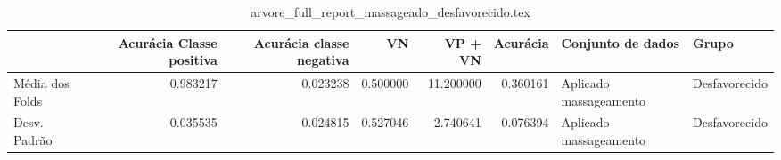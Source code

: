 \begin{table}
\centering
\caption{arvore_full_report_massageado_desfavorecido.tex}
\label{arvore_full_report_massageado_desfavorecido.tex}
\begin{tabular}{lrrrrrll}
\toprule
{} &  Acurácia Classe positiva &  Acurácia classe negativa &       VN  &   VP + VN  &  Acurácia &       Conjunto de dados &          Grupo \\
\midrule
Média dos Folds &                  0.983217 &                  0.023238 &  0.500000 &  11.200000 &  0.360161 &  Aplicado massageamento &  Desfavorecido \\
Desv. Padrão    &                  0.035535 &                  0.024815 &  0.527046 &   2.740641 &  0.076394 &  Aplicado massageamento &  Desfavorecido \\
\bottomrule
\end{tabular}
\end{table}
